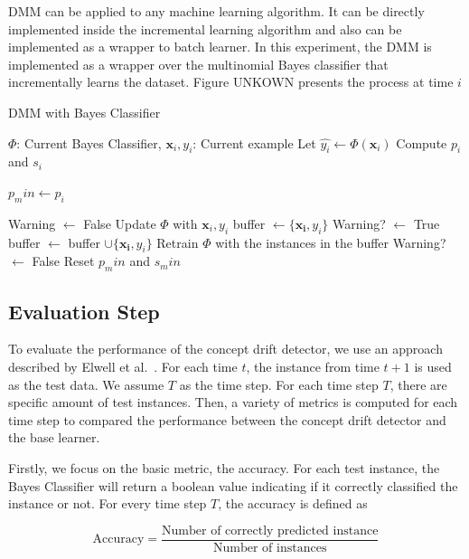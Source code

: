 DMM can be applied to any machine learning algorithm. It can be directly implemented inside the incremental learning algorithm and also can be implemented as a wrapper to batch learner. In this experiment, the DMM is implemented as a wrapper over the multinomial Bayes classifier that incrementally learns the dataset. Figure UNKOWN presents the process at time $i$


\begin{algorithm}
\caption{DMM with Bayes Classifier}
\label{ddm}
\begin{algorithmic}
\Require $\Phi$: Current Bayes Classifier, $\mathbf{x}_i, y_i$: Current example
\State Let $\hat{y_i} \leftarrow \Phi(\mathbf{x}_i)$
\State Compute $p_i$ and $s_i$

	\State $p_min \leftarrow p_i$ 
\EndIf

	\State Warning $\leftarrow$ False
	\State Update $\Phi$ with $\mathbf{x}_i, y_i$
\Else
			\State buffer $\leftarrow \{\mathbf{x_i}, y_i\}$
			\State Warning? $\leftarrow$ True
		\Else
			\State buffer $\leftarrow$ buffer $\cup \{\mathbf{x_i}, y_i\}$
		\EndIf
	\Else
		\State Retrain $\Phi$ with the instances in the buffer
		\State Warning? $\leftarrow$ False
		Reset $p_min$ and $s_min$
	\EndIf 
\EndIf 
\end{algorithmic}
\end{algorithm}

\subsection{Evaluation Step}
\label{cd_metrics}
To evaluate the performance of the concept drift detector, we use an approach described by Elwell et al.~\cite{Elwell2011}. For each time $t$, the instance from time $t+1$ is used as the test data. We assume $T$ as the time step. For each time step $T$, there are specific amount of test instances. Then, a variety of metrics is computed for each time step to compared the performance between the concept drift detector and the base learner. 

Firstly, we focus on the basic metric, the accuracy. For each test instance, the Bayes Classifier will return a boolean value indicating if it correctly classified the instance or not. For every time step $T$, the accuracy is defined as

\begin{equation}
\mbox{Accuracy} = \frac{\mbox{Number of correctly predicted instance} }{\mbox{Number of instances}}
\end{equation}

